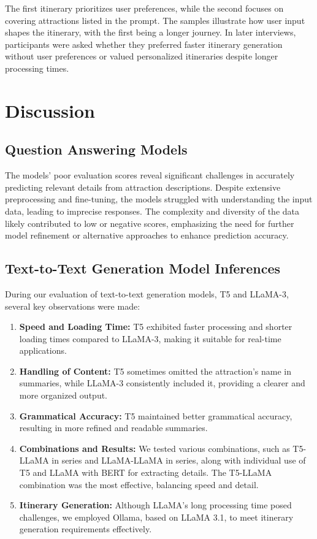 \documentclass[conference]{IEEEtran}
\begin{document}
The first itinerary prioritizes user preferences, while the second focuses on covering attractions listed in the prompt. The samples illustrate how user input shapes the itinerary, with the first being a longer journey. In later interviews, participants were asked whether they preferred faster itinerary generation without user preferences or valued personalized itineraries despite longer processing times.


\section{Discussion}

    \subsection{Question Answering Models}

        The models' poor evaluation scores reveal significant challenges in accurately predicting relevant details from attraction descriptions. Despite extensive preprocessing and fine-tuning, the models struggled with understanding the input data, leading to imprecise responses. The complexity and diversity of the data likely contributed to low or negative scores, emphasizing the need for further model refinement or alternative approaches to enhance prediction accuracy.

    \subsection{Text-to-Text Generation Model Inferences}

    During our evaluation of text-to-text generation models, T5 and LLaMA-3, several key observations were made:

    \begin{enumerate}
        \item \textbf{Speed and Loading Time:} T5 exhibited faster processing and shorter loading times compared to LLaMA-3, making it suitable for real-time applications.

        \item \textbf{Handling of Content:} T5 sometimes omitted the attraction's name in summaries, while LLaMA-3 consistently included it, providing a clearer and more organized output.

        \item \textbf{Grammatical Accuracy:} T5 maintained better grammatical accuracy, resulting in more refined and readable summaries.

        \item \textbf{Combinations and Results:} We tested various combinations, such as T5-LLaMA in series and LLaMA-LLaMA in series, along with individual use of T5 and LLaMA with BERT for extracting details. The T5-LLaMA combination was the most effective, balancing speed and detail.

        \item \textbf{Itinerary Generation:} Although LLaMA's long processing time posed challenges, we employed Ollama, based on LLaMA 3.1, to meet itinerary generation requirements effectively.
    \end{enumerate}
\end{document}
